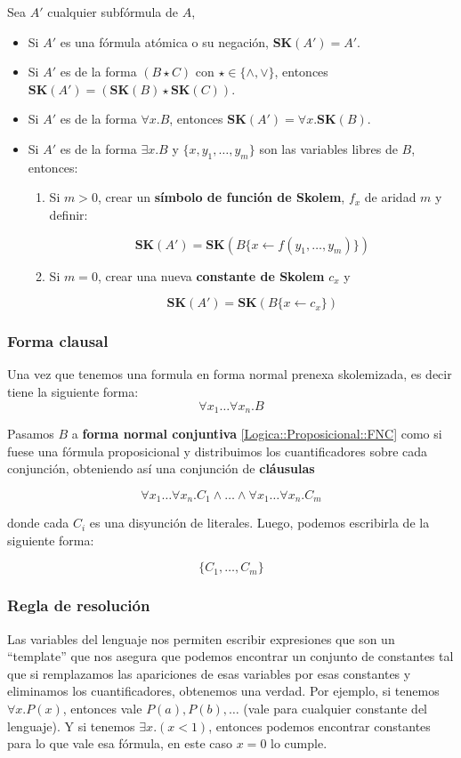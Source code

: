 Sea $A'$ cualquier subfórmula de $A$, 
\begin{itemize}
\item Si $A'$ es una fórmula atómica o su negación, \textbf{SK}$(A') = A'$.
\item Si $A'$ es de la forma $(B\star C)$ con $\star \in \{\land,\lor\}$, entonces $\textbf{SK}(A') = (\textbf{SK}(B)\star \textbf{SK}(C))$.
\item Si $A'$ es de la forma $\forall x.B$, entonces $\textbf{SK}(A') = \forall x.\textbf{SK}(B)$.
\item Si $A'$ es de la forma $\exists x.B$ y $\{x,y_1,\dots,y_m\}$ son las variables libres de $B$, entonces:
\begin{enumerate}
\item Si $m>0$, crear un \textbf{símbolo de función de Skolem}, $f_x$ de aridad $m$ y definir:

$$\textbf{SK}(A') = \textbf{SK}(B\{ x \leftarrow f(y_1,\dots,y_m)\})$$

\item Si $m=0$, crear una nueva \textbf{constante de Skolem} $c_x$ y

$$\textbf{SK}(A') = \textbf{SK}(B\{ x \leftarrow c_x\})$$

\end{enumerate}
\end{itemize}

\subsubsection*{Forma clausal}
Una vez que tenemos una formula en forma normal prenexa skolemizada, es decir tiene la siguiente forma:
 $$\forall x_1\dots\forall x_n.B$$

Pasamos $B$ a \textbf{forma normal conjuntiva} \ref{Logica::Proposicional::FNC} como si fuese una fórmula proposicional y distribuimos los cuantificadores sobre cada conjunción, obteniendo así una conjunción de \textbf{cláusulas}

$$\forall x_1\dots\forall x_n.C_1\land\dots\land\forall x_1\dots\forall x_n.C_m$$

donde cada $C_i$ es una disyunción de literales.  Luego, podemos escribirla de la siguiente forma:

$$ \{C_1,\dots,C_m\}$$

\subsubsection{Regla de resolución}
Las variables del lenguaje nos permiten escribir expresiones que son un ``template'' que nos asegura que podemos encontrar un conjunto de constantes tal que si remplazamos las apariciones de esas variables por esas constantes y eliminamos los cuantificadores, obtenemos una verdad. Por ejemplo, si tenemos $\forall x.P(x)$, entonces vale $P(a),P(b),\dots$ (vale para cualquier constante del lenguaje). Y si tenemos $\exists x.(x < 1)$, entonces podemos encontrar constantes para lo que vale esa fórmula, en este caso $x=0$ lo cumple.

